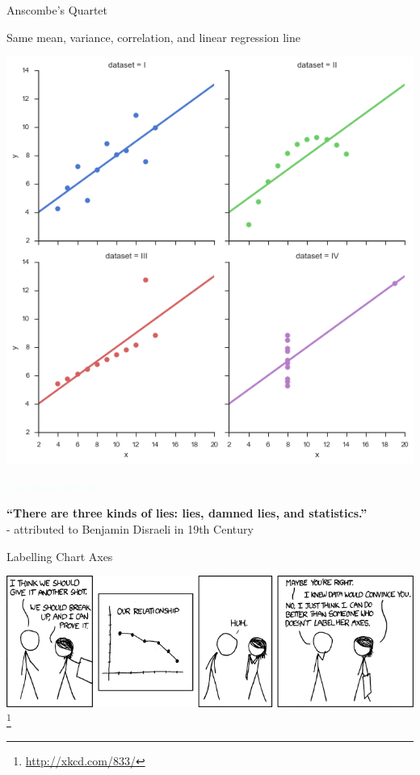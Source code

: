 \documentclass{beamer}
\newcommand{\thblue}[1]{{\Huge {\textcolor{azure}{#1}}}}
\newcommand{\furl}[1]{{\footnote{\url{#1}}}}
\begin{document}
\begin{frame}{Anscombe's Quartet} 

    Same mean, variance, correlation, and linear regression line
    \begin{center}                                                                                                           
        \includegraphics[scale=0.32]{anscombes_quartet.png}                                                                    
    \end{center}                                                                                                             
\end{frame}  

\begin{frame}{} 
    \begin{center}
        \thblue{Graphical Integrity}
    \end{center}
    {\bf ``There are three kinds of lies: lies, damned lies, and statistics.''} \\
    \qquad \qquad - attributed to Benjamin Disraeli in 19th Century
\end{frame}

\begin{frame}{Labelling Chart Axes}
    \begin{center}
        \includegraphics[scale=0.44]{xkcdConvincing.png}\furl{http://xkcd.com/833/}
    \end{center} 
\end{frame}
\end{document}
